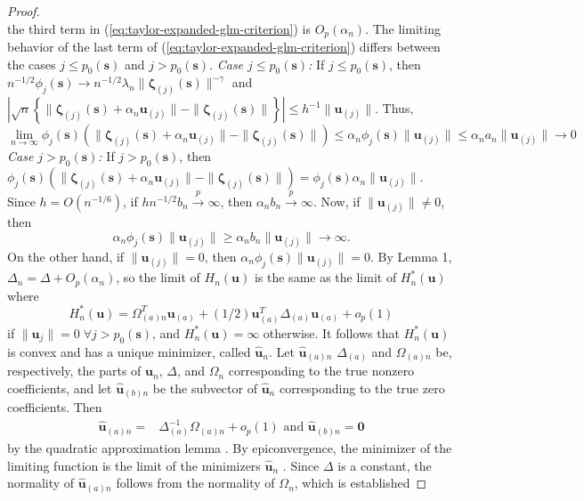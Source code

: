 \documentclass[authoryear,review, 12pt]{elsarticle}
\begin{document}
\begin{proof}
\[\]
the third term in (\ref{eq:taylor-expanded-glm-criterion}) is $O_{p}\left(\alpha_{n}\right)$.
The limiting behavior of the last term of (\ref{eq:taylor-expanded-glm-criterion})
differs between the cases $j\le p_{0}(\bm{s})$ and $j>p_{0}(\bm{s})$.
\emph{Case $j\le p_{0}(\bm{s})$:} If $j\le p_{0}(\bm{s})$, then $n^{-1/2}\phi_{j}(\bm{s})\to n^{-1/2}\lambda_{n}\|\bm{\zeta}_{(j)}(\bm{s})\|^{-\gamma}$
and $|\sqrt{n}\left\{ \|\bm{\zeta}_{(j)}(\bm{s})+\alpha_{n}\bm{u}_{(j)}\|-\|\bm{\zeta}_{(j)}(\bm{s})\|\right\} |\le h^{-1}\|\bm{u}_{(j)}\|$. Thus, 
\[
\lim\limits _{n\to\infty}\phi_{j}(\bm{s})\left(\|\bm{\zeta}_{(j)}(\bm{s})+\alpha_{n}\bm{u}_{(j)}\|-\|\bm{\zeta}_{(j)}(\bm{s})\|\right)\le\alpha_{n}\phi_{j}(\bm{s})\|\bm{u}_{(j)}\|\le\alpha_{n}a_{n}\|\bm{u}_{(j)}\|\to0
\]
\emph{Case $j>p_{0}(\bm{s})$:} If $j>p_{0}(\bm{s})$, then $\phi_{j}(\bm{s})\left(\|\bm{\zeta}_{(j)}(\bm{s})+\alpha_{n}\bm{u}_{(j)}\|-\|\bm{\zeta}_{(j)}(\bm{s})\|\right)=\phi_{j}(\bm{s})\alpha_{n}\|\bm{u}_{(j)}\|$.
Since $h=O(n^{-1/6})$, if $hn^{-1/2}b_{n}\xrightarrow{p}\infty$,
then $\alpha_{n}b_{n}\xrightarrow{p}\infty$. Now, if $\|\bm{u}_{(j)}\|\ne0$,
then 
\[
\alpha_{n}\phi_{j}(\bm{s})\|\bm{u}_{(j)}\|\ge\alpha_{n}b_{n}\|\bm{u}_{(j)}\|\to\infty.
\]
On the other hand, if $\|\bm{u}_{(j)}\|=0$, then $\alpha_{n}\phi_{j}(\bm{s})\|\bm{u}_{(j)}\|=0$.
By Lemma 1, $\Delta_{n}=\Delta+O_{p}\left(\alpha_{n}\right)$,
so the limit of $H_{n}(\bm{u})$ is the same as the limit of $H_{n}^{*}(\bm{u})$
where
\[
H_{n}^{*}(\bm{u})=\Omega_{(a)n}^{T}\bm{u}_{(a)}+(1/2)\bm{u}_{(a)}^{T}\Delta_{(a)}\bm{u}_{(a)}+o_{p}\left(1\right)
\]
if $\|\bm{u}_{j}\|=0\;\forall j>p_{0}(\bm{s})$, and $H_{n}^{*}(\bm{u})=\infty$
otherwise. It follows that $H_{n}^{*}(\bm{u})$ is convex and has
a unique minimizer, called $\hat{\bm{u}}_{n}$. Let $\hat{\bm{u}}_{(a)n}$
$\Delta_{(a)}$ and $\Omega_{(a)n}$ be, respectively, the parts of
$\bm{u}_{n}$, $\Delta$, and $\Omega_{n}$ corresponding to the true
nonzero coefficients, and let $\hat{\bm{u}}_{(b)n}$ be the subvector
of $\hat{\bm{u}}_{n}$ corresponding to the true zero coefficients.
Then
\begin{align*}
\hat{\bm{u}}_{(a)n}= & \Delta_{(a)}^{-1}\Omega_{(a)n}+o_{p}\left(1\right)\text{ and }\hat{\bm{u}}_{(b)n}=\bm{0}
\end{align*}
by the quadratic approximation lemma \citep{Fan-Gijbels-1996}. By epiconvergence, the minimizer of the limiting function is the limit
of the minimizers $\hat{\bm{u}}_{n}$ \citep{Geyer-1994,Knight-Fu-2000}.
Since $\Delta$ is a constant, the normality of $\hat{\bm{u}}_{(a)n}$
follows from the normality of $\Omega_{n}$, which is established

\end{proof}
\end{document}
